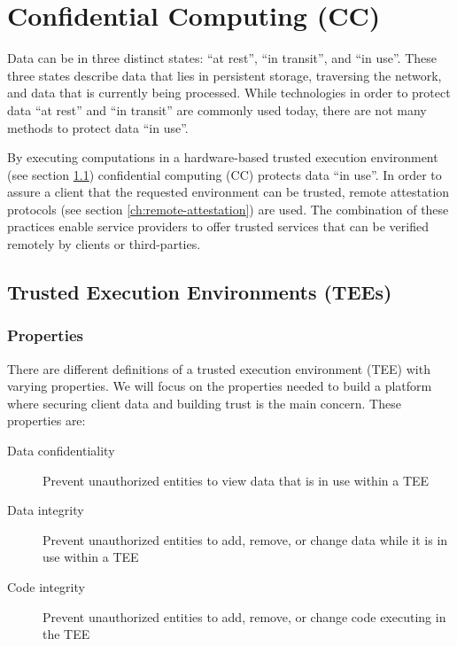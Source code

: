 \section{Confidential Computing (CC)}
\label{ch:confidential-computing}

Data can be in three distinct states: ``at rest'', ``in transit'', and ``in
use''. These three states describe data that lies in persistent storage,
traversing the network, and data that is currently being processed. While
technologies in order to protect data ``at rest'' and ``in transit'' are
commonly used today, there are not many methods to protect data ``in use''.

By executing computations in a hardware-based trusted execution environment (see
section \ref{sec:TEE}) confidential computing (CC) protects data ``in use''. In
order to assure a client that the requested environment can be trusted, remote
attestation protocols (see section \ref{ch:remote-attestation}) are used. The
combination of these practices enable service providers to offer trusted
services that can be verified remotely by clients or third-parties.

\subsection{Trusted Execution Environments (TEEs)}
\label{sec:TEE}

\subsubsection{Properties}

There are different definitions of a trusted execution environment (TEE) with
varying properties. We will focus on the properties needed to build a platform
where securing client data and building trust is the main concern. These
properties are:

\begin{description}
  \item[Data confidentiality]
    Prevent unauthorized entities to view data that is in use within a TEE
  \item[Data integrity]
    Prevent unauthorized entities to add, remove, or change data while it is in
    use within a TEE
  \item[Code integrity]
    Prevent unauthorized entities to add, remove, or change code executing in the
    TEE
\end{description}


